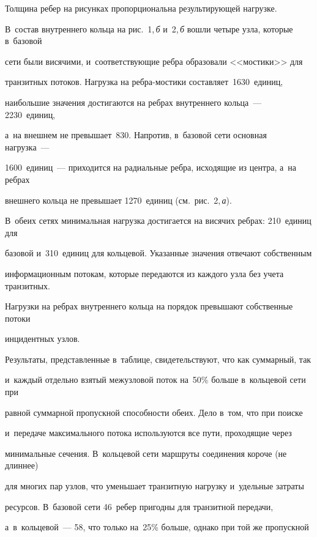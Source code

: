 Толщина ребер на рисунках пропорциональна результирующей на\-груз\-ке.


В~состав внут\-рен\-не\-го кольца на рис.~1,\,\textit{б} и~2,\,\textit{б} вошли четыре узла, которые в~базовой 


сети были висячими, и~соответствующие ребра образовали <<мостики>>  для 


транзитных потоков. Нагрузка на реб\-ра-мос\-ти\-ки  составляет~1630~единиц, 


наибольшие значения  достигаются на реб\-рах внутреннего кольца~--- 2230~единиц, 


а~на внешнем  не превышает~830. Напротив, в~базовой сети основная нагрузка~--- 


1600~единиц~--- приходится на радиальные реб\-ра, исходящие из цент\-ра, а~на реб\-рах 


внешнего кольца не превышает 1270~единиц (см.\ рис.~2,\,\textit{а}).


В~обеих сетях минимальная нагрузка достигается на висячих ребрах: 210~единиц для 


базовой и~310~единиц для кольцевой. Указанные значения отвечают собственным 


информационным потокам, которые передаются из каждого узла без учета транзитных.


Нагрузки на реб\-рах внут\-рен\-не\-го кольца на порядок превышают собственные потоки 


инцидентных узлов.








Результаты, представленные в~таблице, свидетельствуют, что как суммарный, так 


и~каж\-дый отдельно взятый межузловой поток на~50\% больше в~кольцевой сети при 


рав\-ной суммарной пропускной спо\-соб\-ности обеих. Дело в~том, что при поиске 


и~передаче максимального потока используются все пути, проходящие через 


минимальные сечения. В~кольцевой сети маршруты со\-еди\-не\-ния короче (не длиннее) 


для многих пар узлов, что уменьшает транзитную на\-груз\-ку и~удельные затраты 


ресурсов. В~базовой сети 46~ребер пригодны  для транзитной передачи, 


а~в~кольцевой~--- 58, что только на~25\% больше, однако при той же пропускной 


